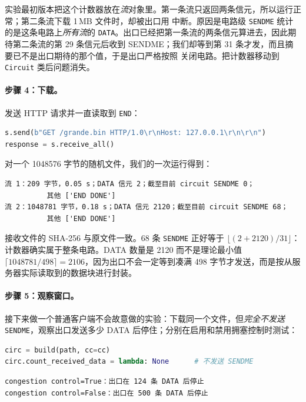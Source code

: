 \begin{attenzione}[一个很有教育意义的错误]
实验最初版本把这个计数器放在\emph{流}对象里。第一条流只返回两条信元，所以运行正常；第二条流下载 1\,MB 文件时，却被出口用  中断。原因是电路级 \texttt{SENDME} 统计的是这条电路上\emph{所有流}的 \texttt{DATA}。出口已经把第一条流的两条信元算进去，因此期待第二条流的第 29 条信元后收到 SENDME；我们却等到第 31 条才发，而且摘要已不是出口期待的那个值，于是出口严格按照  关闭电路。把计数器移动到 \texttt{Circuit} 类后问题消失。
\end{attenzione}

\paragraph{步骤 4：下载。} 发送 HTTP 请求并一直读取到 \texttt{END}：

\begin{lstlisting}[language=Python]
s.send(b"GET /grande.bin HTTP/1.0\r\nHost: 127.0.0.1\r\n\r\n")
response = s.receive_all()
\end{lstlisting}

对一个 \num{1048576} 字节的随机文件，我们的一次运行得到：

\begin{lstlisting}[numbers=none]
流 1：209 字节，0.05 s；DATA 信元 2；截至目前 circuit SENDME 0；
          其他 ['END DONE']
流 2：1048781 字节，0.18 s；DATA 信元 2120；截至目前 circuit SENDME 68；
          其他 ['END DONE']
\end{lstlisting}

接收文件的 SHA-256 与原文件一致。68 条 \texttt{SENDME} 正好等于 $\lfloor(2+2120)/31\rfloor$：计数器确实属于整条电路。DATA 数量是 2120 而不是理论最小值 $\lceil1048781/498\rceil=2106$，因为出口不会一定等到凑满 498 字节才发送，而是按从服务器实际读取到的数据块进行封装。

\paragraph{步骤 5：观察窗口。} 接下来做一个普通客户端不会故意做的实验：下载同一个文件，但\emph{完全不发送} \texttt{SENDME}，观察出口发送多少 DATA 后停住；分别在启用和禁用拥塞控制时测试：

\begin{lstlisting}[language=Python]
circ = build(path, cc=cc)
circ.count_received_data = lambda: None      # 不发送 SENDME
\end{lstlisting}

\begin{lstlisting}[numbers=none]
congestion control=True：出口在 124 条 DATA 后停止
congestion control=False：出口在 500 条 DATA 后停止
\end{lstlisting}

